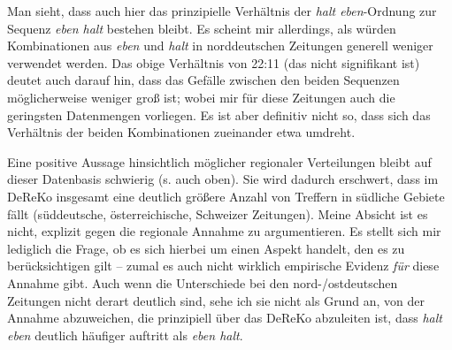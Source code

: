 \begin{table}
	\caption{Häufigkeiten \textit{halt eben} und \textit{eben halt} norddeutsche Zeitungen\label{tab:622}}
\end{table}
Man sieht, dass auch hier das prinzipielle Verhältnis der \textit{halt eben}-Ordnung zur Sequenz \textit{eben halt} bestehen bleibt. Es scheint mir allerdings, als würden Kombinationen aus \textit{eben} und \textit{halt} in norddeutschen Zeitungen generell weniger verwendet werden. Das obige Verhältnis von 22:11 (das nicht signifikant ist) deutet auch darauf hin, dass das Gefälle zwischen den beiden Sequenzen möglicherweise weniger groß ist; wobei mir für diese Zeitungen auch die geringsten Datenmengen vorliegen. Es ist aber definitiv nicht so, dass sich das Verhältnis der beiden Kombinationen zueinander etwa umdreht.

Eine positive Aussage hinsichtlich möglicher regionaler Verteilungen bleibt auf dieser Datenbasis schwierig (s. auch oben). Sie wird dadurch erschwert, dass im DeReKo insgesamt eine deutlich größere Anzahl von Treffern in südliche Gebiete fällt (süddeutsche, österreichische, Schweizer Zeitungen). Meine Absicht ist es nicht, explizit gegen die regionale Annahme zu argumentieren. Es stellt sich mir lediglich die Frage, ob es sich hierbei um einen Aspekt handelt, den es zu berücksichtigen gilt – zumal es auch nicht wirklich empirische Evidenz \emph{für} diese Annahme gibt. Auch wenn die Unterschiede bei den nord-/ostdeutschen Zeitungen nicht derart deutlich sind, sehe ich sie nicht als Grund an, von der Annahme abzuweichen, die prinzipiell über das DeReKo abzuleiten ist, dass \textit{halt eben} deutlich häufiger auftritt als \textit{eben halt}.

